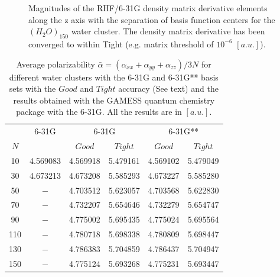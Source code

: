 \documentclass[twocolumn,showpacs,preprintnumbers,amsmath,amssymb]{revtex4}
\begin{document}
\begin{figure}
  \centering
  \caption{\protect
    Magnitudes of the RHF/6-31G density matrix derivative elements 
    along the z axis with the separation of basis function centers
    for the $(H_2O)_{150}$ water cluster. The density matrix 
    derivative has been converged to within Tight (e.g. 
    matrix threshold of $10^{-6}$ $[a.u.]$).
  }\label{fig:DPrimeZ_150_6-31G}
  \begin{center}
  \end{center}
\end{figure}
\begin{table}
  \centering
  \caption{\protect
    Average polarizability $\bar{\alpha}=(\alpha_{xx}+\alpha_{yy}+\alpha_{zz})/3N$
    for different water clusters with the 6-31G and 6-31G** basis sets
    with the $Good$ and $Tight$ accuracy (See text) and the results obtained with
    the GAMESS quantum chemistry package \cite{gamess} with the 6-31G. 
    All the results are in $[a.u.]$.
  }\label{tab:Polari_Values}
    \begin{tabular}{cccccc}
      &\multicolumn{1}{c}{6-31G\footnotemark[1]}
      &\multicolumn{2}{c}{6-31G\footnotemark[2]}
      &\multicolumn{2}{c}{6-31G**\footnotemark[2]}\\
      $N$ & & $Good$ & $Tight$
          & $Good$ & $Tight$\\
      \hline
      10  & 4.569083 & 4.569918 & 5.479161 & 4.569102 & 5.479049  \\
      30  & 4.673213 & 4.673208 & 5.585293 & 4.673227 & 5.585280  \\
      50  & $-$      & 4.703512 & 5.623057 & 4.703568 & 5.622830  \\
      70  & $-$      & 4.732207 & 5.654646 & 4.732279 & 5.654747  \\
      90  & $-$      & 4.775002 & 5.695435 & 4.775024 & 5.695564  \\
      110 & $-$      & 4.780718 & 5.698338 & 4.780809 & 5.698447  \\
      130 & $-$      & 4.786383 & 5.704859 & 4.786437 & 5.704947  \\
      150 & $-$      & 4.775124 & 5.693268 & 4.775231 & 5.693447  \\
    \end{tabular}
\end{table}
\end{document}
